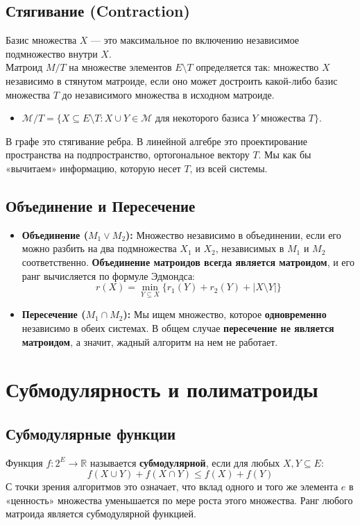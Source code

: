 \subsection{Стягивание (Contraction)}
Базис множества $X$ — это максимальное по включению независимое подмножество внутри $X$. \\
Матроид $M / T$ на множестве элементов $E \setminus T$ определяется так: множество $X$ независимо в стянутом матроиде, если оно может достроить какой-либо базис множества $T$ до независимого множества в исходном матроиде.
\begin{itemize}
    \item $\mathcal{M} / T = \{X \subseteq E \setminus T : X \cup Y \in \mathcal{M} \text{ для некоторого базиса } Y \text{ множества } T\}$.
\end{itemize}
В графе это стягивание ребра. В линейной алгебре это проектирование пространства на подпространство, ортогональное вектору $T$. Мы как бы «вычитаем» информацию, которую несет $T$, из всей системы.

\subsection{Объединение и Пересечение}
\begin{itemize}
    \item \textbf{Объединение ($M_1 \vee M_2$):} Множество независимо в объединении, если его можно разбить на два подмножества $X_1$ и $X_2$, независимых в $M_1$ и $M_2$ соответственно. \textbf{Объединение матроидов всегда является матроидом}, и его ранг вычисляется по формуле Эдмондса:
    \[ r(X) = \min_{Y \subseteq X} \{r_1(Y) + r_2(Y) + |X \setminus Y|\} \]
    \item \textbf{Пересечение ($M_1 \cap M_2$):} Мы ищем множество, которое \textbf{одновременно} независимо в обеих системах. В общем случае \textbf{пересечение не является матроидом}, а значит, жадный алгоритм на нем не работает.
\end{itemize}

\section{Субмодулярность и полиматроиды}

\subsection{Субмодулярные функции}
Функция $f: 2^E \to \mathbb{R}$ называется \textbf{субмодулярной}, если для любых $X, Y \subseteq E$:
\[ f(X \cup Y) + f(X \cap Y) \leq f(X) + f(Y) \]
С точки зрения алгоритмов это означает, что вклад одного и того же элемента $e$ в «ценность» множества уменьшается по мере роста этого множества. Ранг любого матроида является субмодулярной функцией.

